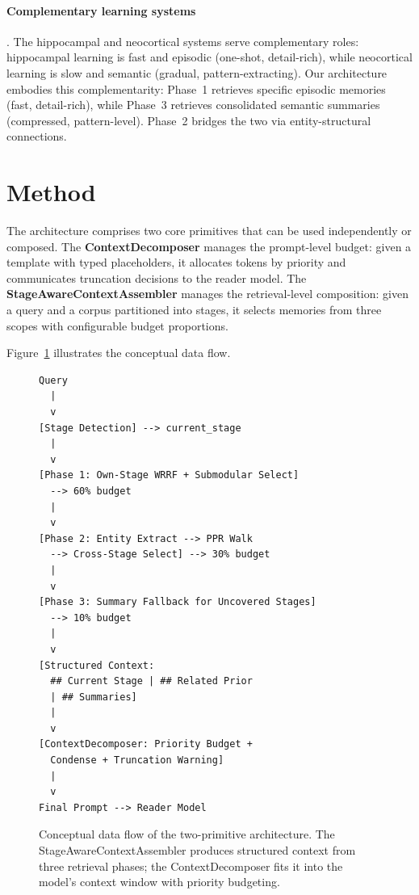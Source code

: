 \documentclass[11pt]{article}
\begin{document}
\paragraph{Complementary learning systems} \citep{McClelland1995}.
The hippocampal and neocortical systems serve complementary roles:
hippocampal learning is fast and episodic (one-shot, detail-rich),
while neocortical learning is slow and semantic (gradual,
pattern-extracting).  Our architecture embodies this complementarity:
Phase~1 retrieves specific episodic memories (fast, detail-rich),
while Phase~3 retrieves consolidated semantic summaries (compressed,
pattern-level).  Phase~2 bridges the two via entity-structural
connections.

\section{Method}
\label{sec:method}

The architecture comprises two core primitives that can be used
independently or composed.  The \textbf{ContextDecomposer} manages
the prompt-level budget: given a template with typed placeholders, it
allocates tokens by priority and communicates truncation decisions to
the reader model.  The \textbf{StageAwareContextAssembler} manages
the retrieval-level composition: given a query and a corpus
partitioned into stages, it selects memories from three scopes with
configurable budget proportions.

Figure~\ref{fig:dataflow} illustrates the conceptual data flow.

\begin{figure}[t]
\centering
\small
\begin{verbatim}
Query
  |
  v
[Stage Detection] --> current_stage
  |
  v
[Phase 1: Own-Stage WRRF + Submodular Select]
  --> 60% budget
  |
  v
[Phase 2: Entity Extract --> PPR Walk
  --> Cross-Stage Select] --> 30% budget
  |
  v
[Phase 3: Summary Fallback for Uncovered Stages]
  --> 10% budget
  |
  v
[Structured Context:
  ## Current Stage | ## Related Prior
  | ## Summaries]
  |
  v
[ContextDecomposer: Priority Budget +
  Condense + Truncation Warning]
  |
  v
Final Prompt --> Reader Model
\end{verbatim}
\caption{Conceptual data flow of the two-primitive architecture.  The
StageAwareContextAssembler produces structured context from three
retrieval phases; the ContextDecomposer fits it into the model's
context window with priority budgeting.}
\label{fig:dataflow}
\end{figure}
\end{document}

